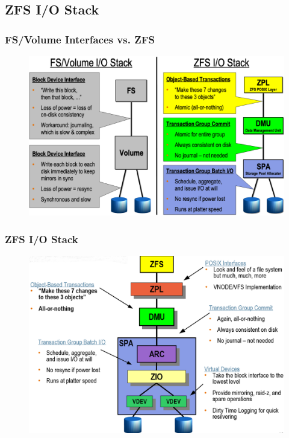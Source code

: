 \subsection{ZFS I/O Stack} %
\begin{frame}[fragile]
    \frametitle{FS/Volume Interfaces vs. ZFS}
    \begin{figure}
    \includegraphics[width=0.8\linewidth]{figs/ZFS-io-stack.png}
    \end{figure}
\end{frame}
% 
% 
% 
\begin{frame}[fragile]
    \frametitle{ZFS I/O Stack}
    \begin{figure}
    \includegraphics[width=0.8\linewidth]{figs/ZFS-stack.png}
    \end{figure}  
\end{frame}
